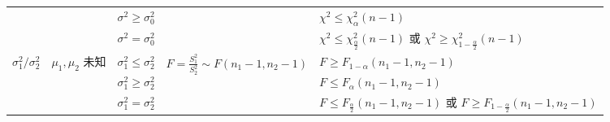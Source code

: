 \documentclass[lang=cn,11pt]{elegantbook}
\begin{document}
\begin{table}[htbp]
{\begin{tabular}{lllll}
& & $\sigma^2 \geq \sigma_0^2$ & & $\chi^2 \leq \chi^2_\alpha(n-1)$ \\
& & $\sigma^2 = \sigma_0^2$ & & $\chi^2 \leq \chi^2_{\frac{\alpha}{2}}(n-1)$ 或 $\chi^2 \geq \chi^2_{1-\frac{\alpha}{2}}(n-1)$ \\
\midrule
\multirow{3}{*}{$\sigma_1^2 / \sigma_2^2$} & \multirow{3}{*}{$\mu_1,\mu_2$ 未知} & $\sigma_1^2 \leq \sigma_2^2$ & \multirow{3}{*}{$F = \frac{S_1^2}{S_2^2} \sim F(n_1-1,n_2-1)$} & $F \geq F_{1-\alpha}(n_1-1,n_2-1)$ \\
& & $\sigma_1^2 \geq \sigma_2^2$ & & $F \leq F_\alpha(n_1-1,n_2-1)$ \\
& & $\sigma_1^2 = \sigma_2^2$ & & $F \leq F_{\frac{\alpha}{2}}(n_1-1,n_2-1)$ 或 $F \geq F_{1-\frac{\alpha}{2}}(n_1-1,n_2-1)$ \\
\bottomrule
\end{tabular}
}
\end{table}
\end{document}
